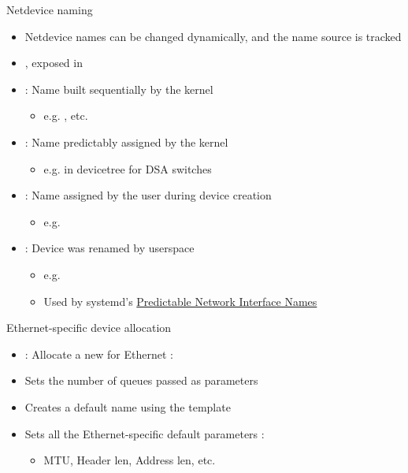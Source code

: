 \begin{frame}{Netdevice naming}
	\begin{itemize}
		\item Netdevice names can be changed dynamically, and the name source is tracked
		\item {}, exposed in 
		\item {} : Name built sequentially by the kernel 
			\begin{itemize}
				\item e.g. , etc.
			\end{itemize}
		\item {} : Name predictably assigned by the kernel
			\begin{itemize}
				\item e.g.  in devicetree for DSA switches
			\end{itemize}
		\item {} : Name assigned by the user during device creation
			\begin{itemize}
				\item e.g. 
			\end{itemize}
		\item {} : Device was renamed by userspace
			\begin{itemize}
				\item e.g. 
				\item Used by systemd's \href{https://www.freedesktop.org/wiki/Software/systemd/PredictableNetworkInterfaceNames/}{Predictable Network Interface Names}
			\end{itemize}
	\end{itemize}
\end{frame}

\begin{frame}{Ethernet-specific device allocation}
	\begin{itemize}
		\item {} : Allocate a new  for Ethernet :
		\item Sets the number of queues passed as parameters
		\item Creates a default name using the  template
		\item Sets all the Ethernet-specific default parameters :
			\begin{itemize}
				\item MTU, Header len, Address len, etc.
			\end{itemize}
	\end{itemize}
\end{frame}

